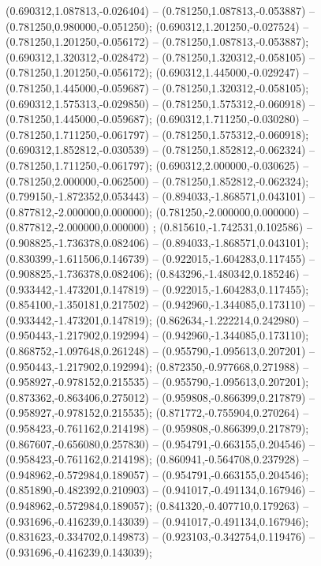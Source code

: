 (0.690312,1.087813,-0.026404) -- (0.781250,1.087813,-0.053887) -- (0.781250,0.980000,-0.051250);
 (0.690312,1.201250,-0.027524) -- (0.781250,1.201250,-0.056172) -- (0.781250,1.087813,-0.053887);
 (0.690312,1.320312,-0.028472) -- (0.781250,1.320312,-0.058105) -- (0.781250,1.201250,-0.056172);
 (0.690312,1.445000,-0.029247) -- (0.781250,1.445000,-0.059687) -- (0.781250,1.320312,-0.058105);
 (0.690312,1.575313,-0.029850) -- (0.781250,1.575312,-0.060918) -- (0.781250,1.445000,-0.059687);
 (0.690312,1.711250,-0.030280) -- (0.781250,1.711250,-0.061797) -- (0.781250,1.575312,-0.060918);
 (0.690312,1.852812,-0.030539) -- (0.781250,1.852812,-0.062324) -- (0.781250,1.711250,-0.061797);
 (0.690312,2.000000,-0.030625) -- (0.781250,2.000000,-0.062500) -- (0.781250,1.852812,-0.062324);
 (0.799150,-1.872352,0.053443) -- (0.894033,-1.868571,0.043101) -- (0.877812,-2.000000,0.000000);
 (0.781250,-2.000000,0.000000) -- (0.877812,-2.000000,0.000000) ;
 (0.815610,-1.742531,0.102586) -- (0.908825,-1.736378,0.082406) -- (0.894033,-1.868571,0.043101);
 (0.830399,-1.611506,0.146739) -- (0.922015,-1.604283,0.117455) -- (0.908825,-1.736378,0.082406);
 (0.843296,-1.480342,0.185246) -- (0.933442,-1.473201,0.147819) -- (0.922015,-1.604283,0.117455);
 (0.854100,-1.350181,0.217502) -- (0.942960,-1.344085,0.173110) -- (0.933442,-1.473201,0.147819);
 (0.862634,-1.222214,0.242980) -- (0.950443,-1.217902,0.192994) -- (0.942960,-1.344085,0.173110);
 (0.868752,-1.097648,0.261248) -- (0.955790,-1.095613,0.207201) -- (0.950443,-1.217902,0.192994);
 (0.872350,-0.977668,0.271988) -- (0.958927,-0.978152,0.215535) -- (0.955790,-1.095613,0.207201);
 (0.873362,-0.863406,0.275012) -- (0.959808,-0.866399,0.217879) -- (0.958927,-0.978152,0.215535);
 (0.871772,-0.755904,0.270264) -- (0.958423,-0.761162,0.214198) -- (0.959808,-0.866399,0.217879);
 (0.867607,-0.656080,0.257830) -- (0.954791,-0.663155,0.204546) -- (0.958423,-0.761162,0.214198);
 (0.860941,-0.564708,0.237928) -- (0.948962,-0.572984,0.189057) -- (0.954791,-0.663155,0.204546);
 (0.851890,-0.482392,0.210903) -- (0.941017,-0.491134,0.167946) -- (0.948962,-0.572984,0.189057);
 (0.841320,-0.407710,0.179263) -- (0.931696,-0.416239,0.143039) -- (0.941017,-0.491134,0.167946);
 (0.831623,-0.334702,0.149873) -- (0.923103,-0.342754,0.119476) -- (0.931696,-0.416239,0.143039);
